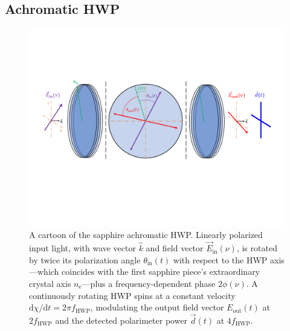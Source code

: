 
\subsection{Achromatic HWP}
\label{sec:achromatic_hwp}

\begin{figure}[!t]
    \centering
    \includegraphics[width=\linewidth, trim=1.2cm 7cm 1.2cm 4cm, clip]{PolarizationModulation/Figures/HWP_cartoon.pdf}
    \caption{A cartoon of the sapphire achromatic HWP. Linearly polarized input light, with wave vector $\hat{k}$ and field vector $\vec{E}_{\mathrm{in}}(\nu)$, is rotated by twice its polarization angle $\theta_{\mathrm{in}}(t)$ with respect to the HWP axis---which coincides with the first sapphire piece's extraordinary crystal axis $n_{\mathrm{e}}$---plus a frequency-dependent phase $2 \phi(\nu)$. A continuously rotating HWP spins at a constant velocity $\mathrm{d} \chi / \mathrm{d} t = 2 \pi f_{\mathrm{HWP}}$, modulating the output field vector $E_{\mathrm{out}}(t)$ at $2 f_{\mathrm{HWP}}$ and the detected polarimeter power $\vec{d}(t)$ at $4 f_{\mathrm{HWP}}$.}
    \label{fig:ahwp_cartoon}
\end{figure}


